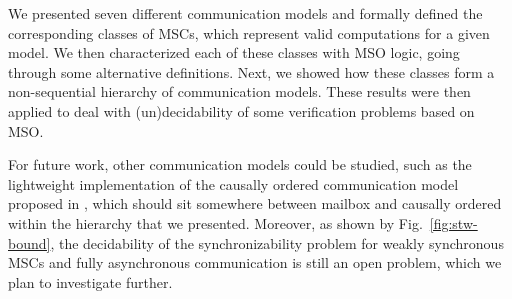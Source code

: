 We presented seven different communication models and formally defined the corresponding classes of MSCs, which represent valid computations for a given model. We then characterized each of these classes with MSO logic, going through some alternative definitions. Next, we showed how these classes form a non-sequential hierarchy of communication models. These results were then applied to deal with (un)decidability of some verification problems based on MSO. 

For future work, other communication models could be studied, such as the lightweight implementation of the causally ordered communication model proposed in \cite{DBLP:conf/dagstuhl/MatternF94}, which should sit somewhere between mailbox and causally ordered within the hierarchy that we presented. Moreover, as shown by Fig.~\ref{fig:stw-bound}, the decidability of the synchronizability problem for weakly synchronous MSCs and fully asynchronous communication is still an open problem, which we plan to investigate further.